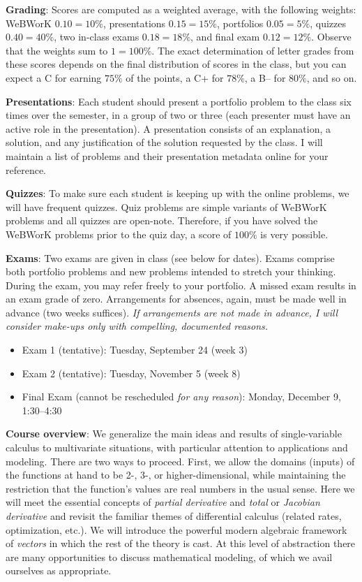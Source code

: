 \documentclass[12pt,twoside]{amsart}
\begin{document}
\textbf{Grading}: Scores are computed as a weighted average, with the following weights: WeBWorK $0.10 = 10\%$, presentations $0.15 = 15\%$, portfolios $0.05 = 5\%$, quizzes $0.40 = 40\%$, two in-class exams $0.18 = 18\%$, and final exam $0.12 = 12\%$. Observe that the weights sum to $1 = 100\%$. The exact determination of letter grades from these scores depends on the final distribution of scores in the class, but you can expect a C for earning $75\%$ of the points, a C+ for $78\%$, a B-- for $80\%$, and so on.

\textbf{Presentations}: Each student should present a portfolio problem to the class six times over the semester, in a group of two or three (each presenter must have an active role in the presentation). A presentation consists of an explanation, a solution, and any justification of the solution requested by the class. I will maintain a list of problems and their presentation metadata online for your reference.

\textbf{Quizzes}: To make sure each student is keeping up with the online problems, we will have frequent quizzes. Quiz problems are simple variants of WeBWorK problems and all quizzes are open-note. Therefore, if you have solved the WeBWorK problems prior to the quiz day, a score of $100\%$ is very possible.

\textbf{Exams}: Two exams are given in class (see below for dates). Exams comprise both portfolio problems and new problems intended to stretch your thinking. During the exam, you may refer freely to your portfolio. A missed exam results in an exam grade of zero. Arrangements for absences, again, must be made well in advance (two weeks suffices). \emph{If arrangements are not made in advance, I will consider make-ups only with compelling, documented reasons.} 
\begin{itemize}
	\item Exam 1 (tentative): Tuesday, September 24 (week 3)
    \item Exam 2 (tentative): Tuesday, November 5 (week 8)
	\item Final Exam (cannot be rescheduled \emph{for any reason}): Monday, December 9, 1:30--4:30
\end{itemize}

\textbf{Course overview}: We generalize the main ideas and results of single-variable calculus to multivariate situations, with particular attention to applications and modeling. There are two ways to proceed. First, we allow the domains (inputs) of the functions at hand to be 2-, 3-, or higher-dimensional, while maintaining the restriction that the function's values are real numbers in the usual sense. Here we will meet the essential concepts of \emph{partial derivative} and \emph{total} or \emph{Jacobian derivative} and revisit the familiar themes of differential calculus (related rates, optimization, etc.). We will introduce the powerful modern algebraic framework of \emph{vectors} in which the rest of the theory is cast. At this level of abstraction there are many opportunities to discuss mathematical modeling, of which we avail ourselves as appropriate.
\end{document}
